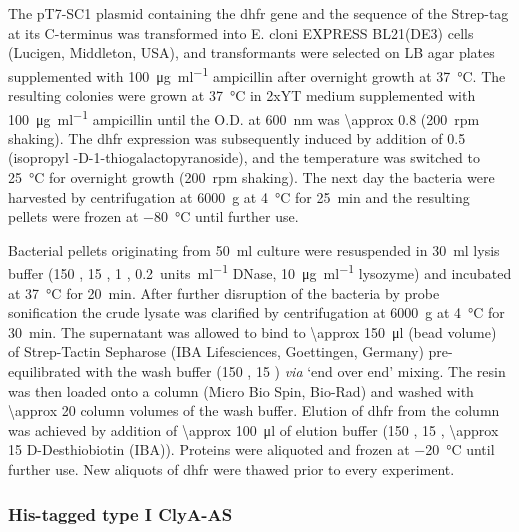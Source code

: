 The pT7-SC1 plasmid containing the \gls{dhfr} gene and the sequence of the Strep-tag at its C-terminus was
transformed into E. cloni\textsuperscript{\textregistered} EXPRESS BL21(DE3) cells (Lucigen, Middleton, USA),
and transformants were selected on LB agar plates supplemented with \SI{100}{\micro\gram\per\milli\litre}
ampicillin after overnight growth at \SI{37}{\celsius}. The resulting colonies were grown at \SI{37}{\celsius}
in 2xYT medium supplemented with \SI{100}{\micro\gram\per\milli\litre} ampicillin until the O.D. at
\SI{600}{\nano\meter} was \num{\approx 0.8} (\SI{200}{rpm} shaking). The \gls{dhfr} expression was
subsequently induced by addition of \SI{0.5}{\mM}  (isopropyl \textbeta-D-1-thiogalactopyranoside),
and the temperature was switched to \SI{25}{\celsius} for overnight growth (200~rpm shaking). The next day the
bacteria were harvested by centrifugation at \SI{6000}{g} at \SI{4}{\celsius} for \SI{25}{\minute} and the
resulting pellets were frozen at \SI{-80}{\celsius} until further use.

Bacterial pellets originating from \SI{50}{\milli\litre} culture were resuspended in \SI{30}{\milli\litre}
lysis buffer (\SI{150}{\mM} , \SI{15}{\mM}  , \SI{1}{\mM} ,
\SI{0.2}{units\per\milli\litre} DNase, \SI{10}{\micro\gram\per\milli\litre} lysozyme) and incubated at
\SI{37}{\celsius} for \SI{20}{\minute}. After further disruption of the bacteria by probe sonification the
crude lysate was clarified by centrifugation at \SI{6000}{g} at \SI{4}{\celsius} for \SI{30}{\minute}. The
supernatant was allowed to bind to \SI{\approx 150}{\micro\litre} (bead volume) of
Strep-Tactin\textsuperscript{\textregistered} Sepharose\textsuperscript{\textregistered} (IBA Lifesciences,
Goettingen, Germany) pre-equilibrated with the wash buffer (\SI{150}{\mM} , \SI{15}{\mM}
 ) \textit{via} `end over end' mixing. The resin was then loaded onto a column (Micro Bio
Spin, Bio-Rad) and washed with \num{\approx 20} column volumes of the wash buffer. Elution of \gls{dhfr} from
the column was achieved by addition of \SI{\approx 100}{\micro\litre} of elution buffer (\SI{150}{\mM}
, \SI{15}{\mM}  , \SI{\approx 15}{\mM} D-Desthiobiotin (IBA)). Proteins were
aliquoted and frozen at \SI{-20}{\celsius} until further use. New aliquots of \gls{dhfr} were thawed prior to
every experiment.


\subsubsection{His-tagged type {I} {ClyA-AS}}
%

